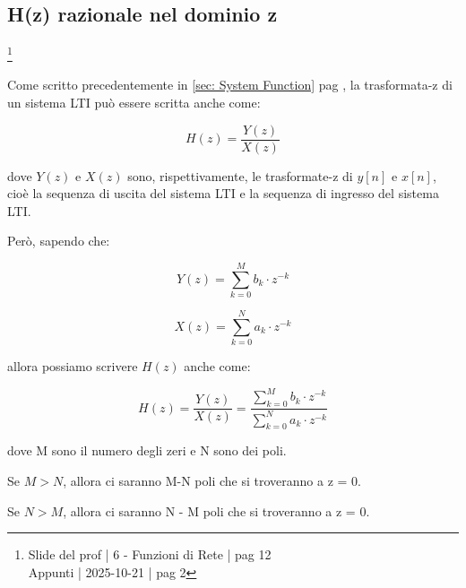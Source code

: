 \newpage 

\subsection{H(z) razionale nel dominio z}

\footnote{ 
    Slide del prof | 6 - Funzioni di Rete | pag 12\\
    Appunti | 2025-10-21 | pag 2
} 

Come scritto precedentemente in \ref{sec: System Function}  pag \pageref{sec: System Function}, 
la trasformata-z di un sistema LTI può essere scritta anche come: 

{
    \Large 
    \begin{equation}
        H \left(z\right)
        = 
        \dfrac{Y \left(z\right)}{X \left(z\right)}
    \end{equation}
}

dove $Y \left(z\right)$ e $X \left(z\right)$ sono, rispettivamente, le trasformate-z di $y \left[ n\right]$ e $x \left[ n\right]$, cioè la sequenza di uscita del sistema LTI e la sequenza di ingresso del sistema LTI. \newline 


Però, sapendo che: 

{
    \Large 
    \begin{equation}
        Y \left(z \right) = \sum_{k = 0}^{M} b_k \cdot z^{-k}
    \end{equation}
}

{
    \Large 
    \begin{equation}
        X \left(z \right) = \sum_{k = 0}^{N} a_k \cdot z^{-k}
    \end{equation}
}

allora possiamo scrivere $H \left(z\right)$ anche come: 

{
    \Large 
    \begin{equation}
        H \left(z\right)
        = 
        \dfrac{Y \left(z\right)}{X \left(z\right)} 
        = 
        \dfrac{\sum_{k = 0}^{M} b_k \cdot z^{-k}}{\sum_{k = 0}^{N} a_k \cdot z^{-k}}
    \end{equation}
}

dove M sono il numero degli zeri e N sono dei poli. \newline 

Se $M > N$, allora ci saranno M-N poli che si troveranno a z = 0. \newline 

Se $N > M$, allora ci saranno N - M poli che si troveranno a z = 0. \newline 

